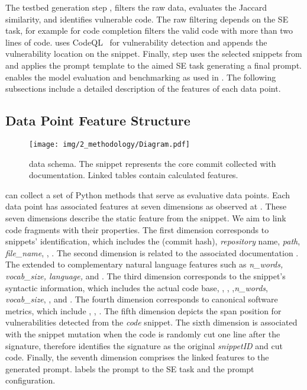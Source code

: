 The testbed generation step , filters the raw data, evaluates the Jaccard similarity, and identifies vulnerable code. The raw filtering depends on the SE task, for example for code completion \snipgen filters the valid code with more than two lines of code. \snipgen uses CodeQL~\cite{codeql_overview} for vulnerability detection and appends the vulnerability location on the snippet. Finally, step  uses the selected snippets from  and applies the prompt template to the aimed SE task generating a final prompt. 
\snipgen enables the model evaluation and benchmarking as used in \cite{galeras, astexplainer, syntax_capabilities}.
The following subsections include a detailed description of the features of each data point.

\subsection{Data Point Feature Structure}
\begin{figure}[h]
		\centering
		\texttt{[image: img/2\_methodology/Diagram.pdf]}
		\caption{\snipgen data schema. The snippet represents the core commit collected with documentation.  Linked tables contain calculated features. }
        \label{fig:diagram}
\end{figure}
\snipgen can collect a set of Python methods that serve as evaluative data points. Each data point has associated features at seven dimensions as observed at . These seven dimensions describe the static feature from the snippet. We aim to link code fragments with their properties. The first dimension corresponds to snippets' identification,  which includes the \commitID (\ie commit hash), \textit{repository} name, \textit{path}, \textit{file\_name}, \funName, \commitMessage. The second dimension is related to the associated documentation \docstring. The \docstring extended to complementary natural language features such as \textit{n\_words, vocab\_size, language,} and \whitespaces. The third dimension corresponds to the snippet's syntactic information, which includes the actual code base, \ASTerrors, \ASTlevels, \ASTnodes,\textit{n\_words}, \textit{vocab\_size}, \tokenCount, and \whitespaces. The fourth dimension corresponds to canonical software metrics, which include \nloc, \complexity, \identifiers. The fifth dimension depicts the span position for vulnerabilities detected from the \textit{code} snippet. The sixth dimension is associated with the snippet mutation when the code is randomly cut one line after the signature, therefore \snipgen identifies the signature as the original \textit{snippetID} and cut code. Finally, the seventh dimension comprises the linked features to the generated prompt. \snipgen labels the prompt to the SE task and the prompt configuration.


